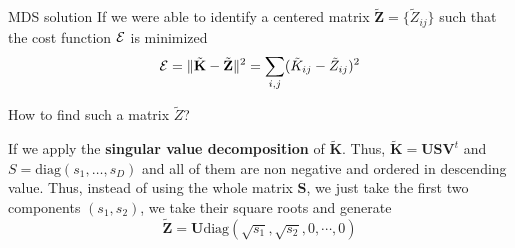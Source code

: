 \documentclass{beamer}
\begin{document}
\begin{frame}{MDS solution}
	If we were able to identify a centered matrix $\tilde{\textbf{Z}}=\{\tilde{Z}_{ij}\}$
such that the cost function $\cal{E}$ is minimized
	\begin{equation*}
		{\cal E}=\| \tilde{\textbf{K}}- \tilde{\textbf{Z}} \|^2=\sum_{i,j} ( \tilde{K}_{ij} - \tilde{Z}_{ij})^2 
	\end{equation*}
	
	How to find such a matrix $\tilde{Z}$? 
	
	If we apply the \textbf{singular value decomposition} of $\tilde{\textbf{K}}$. Thus, $\tilde{\textbf{K}}=\textbf{U} \textbf{S} \textbf{V}^t$ and $S=\text{diag}(s_1,\ldots,s_D)$ and all of them are non negative and ordered in descending value.
	Thus, instead of using the whole matrix $\textbf{S}$, we just take the first two components $(s_1,s_2)$, we take their square roots and generate
\begin{equation*}
\tilde{\textbf{Z}}= \textbf{U} \text{diag}(\sqrt{s_1},\sqrt{s_2},0,\cdots,0)
\end{equation*}
\end{frame}


%
%
\end{document}
